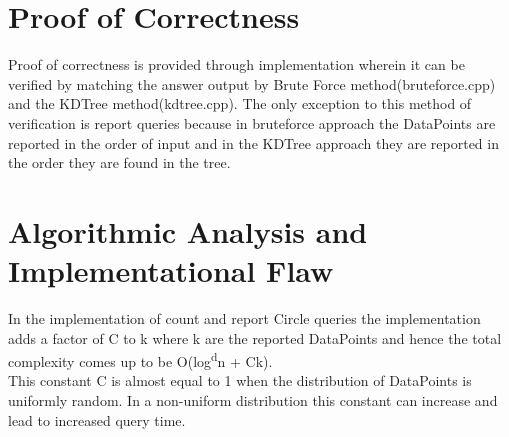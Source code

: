 \documentclass[11pt]{article}
\begin{document}
\section{Proof of Correctness}
Proof of correctness is provided through implementation wherein it can be verified by matching the answer output by Brute Force method(bruteforce.cpp) and the KDTree method(kdtree.cpp).
The only exception to this method of verification is report queries because in bruteforce approach the DataPoints are reported in the order of input and in the KDTree approach they are reported in the order they are found in the tree.

\section{Algorithmic Analysis and Implementational Flaw}
In the implementation of count and report Circle queries the implementation adds a factor of C to k where k are the reported DataPoints and hence the total complexity comes up to be O(log\textsuperscript{d}n + Ck).\\
\indent This constant C is almost equal to 1 when the distribution of DataPoints is uniformly random. In a non-uniform distribution this constant can increase and lead to increased query time.
\end{document}
